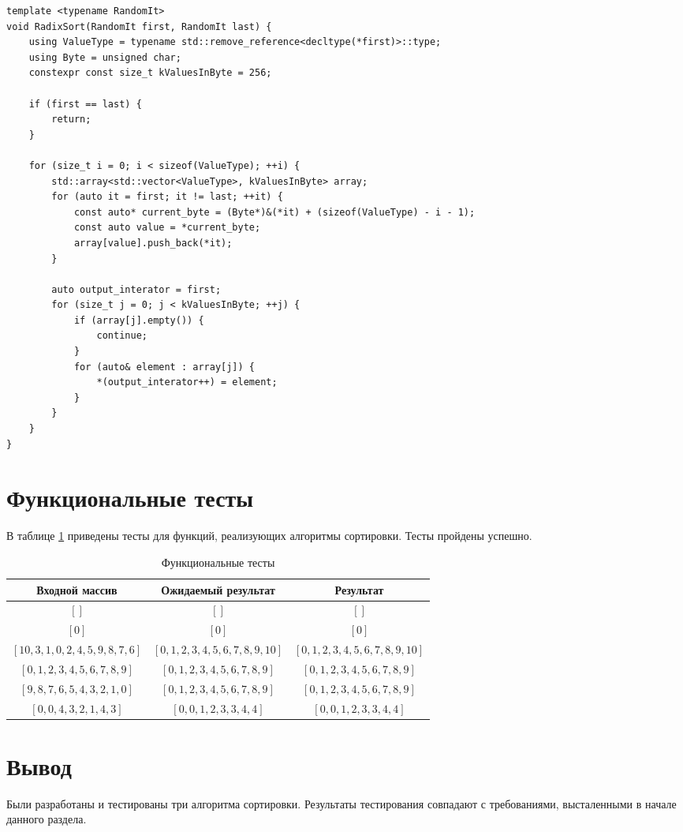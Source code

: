 \begin{lstlisting}[label=lst:sheyker_sort,caption=Алгоритм побитовой сортировки]
template <typename RandomIt>
void RadixSort(RandomIt first, RandomIt last) {
    using ValueType = typename std::remove_reference<decltype(*first)>::type;
    using Byte = unsigned char;
    constexpr const size_t kValuesInByte = 256;

    if (first == last) {
        return;
    }

    for (size_t i = 0; i < sizeof(ValueType); ++i) {
        std::array<std::vector<ValueType>, kValuesInByte> array;
        for (auto it = first; it != last; ++it) {
            const auto* current_byte = (Byte*)&(*it) + (sizeof(ValueType) - i - 1);
            const auto value = *current_byte;
            array[value].push_back(*it);
        }

        auto output_interator = first;
        for (size_t j = 0; j < kValuesInByte; ++j) {
            if (array[j].empty()) {
                continue;
            }
            for (auto& element : array[j]) {
                *(output_interator++) = element;
            }
        }
    }
}
\end{lstlisting}

\section{Функциональные тесты}

В таблице \ref{tbl:tests} приведены тесты для функций, реализующих алгоритмы сортировки. Тесты пройдены успешно.


\begin{table}[h]
\begin{center}
\caption{\label{tbl:tests} Функциональные тесты}
\begin{tabular}{|c|c|c|}
\hline
Входной массив & Ожидаемый результат & Результат \\
\hline
$[]$ & $[]$  & $[]$\\
$[0]$  & $[0]$ & $[0]$\\
$[10, 3, 1, 0, 2, 4, 5, 9, 8, 7, 6]$  & $[0, 1, 2, 3, 4, 5, 6, 7, 8, 9, 10]$  & $[0, 1, 2, 3, 4, 5, 6, 7, 8, 9, 10]$\\
$[0, 1, 2, 3, 4, 5, 6, 7, 8, 9]$  & $[0, 1, 2, 3, 4, 5, 6, 7, 8, 9]$  & $[0, 1, 2, 3, 4, 5, 6, 7, 8, 9]$\\
$[9, 8, 7, 6, 5, 4, 3, 2, 1, 0]$  & $[0, 1, 2, 3, 4, 5, 6, 7, 8, 9]$  & $[0, 1, 2, 3, 4, 5, 6, 7, 8, 9]$\\
$[0, 0, 4, 3, 2, 1, 4, 3]$  & $[0, 0, 1, 2, 3, 3, 4, 4]$  & $[0, 0, 1, 2, 3, 3, 4, 4]$\\
\hline
\end{tabular}
\end{center}
\end{table}


\section*{Вывод}

Были разработаны и тестированы три алгоритма сортировки. Результаты тестирования
совпадают с требованиями, высталенными в начале данного раздела.
